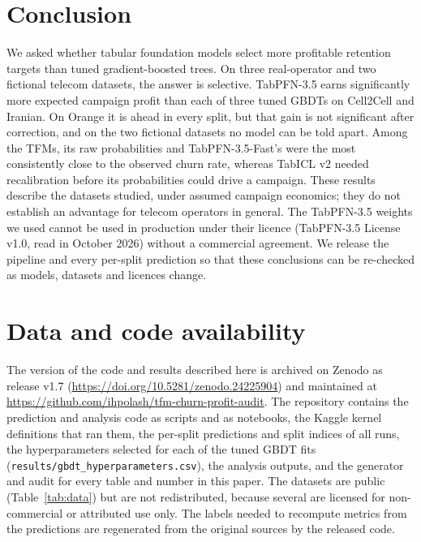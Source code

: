 \documentclass[11pt]{article}
\newcommand{\tfms}{TFMs\xspace}
\begin{document}
\section{Conclusion}

We asked whether tabular foundation models select more profitable retention targets than tuned gradient-boosted trees.
On three real-operator and two fictional telecom datasets, the answer is selective. TabPFN-3.5 earns significantly more
expected campaign profit than each of three tuned GBDTs on Cell2Cell and Iranian. On Orange it is ahead in every
split, but that gain is not significant after correction, and on the two fictional datasets no model can be told
apart. Among the \tfms, its raw probabilities and TabPFN-3.5-Fast's were the most consistently close to the observed churn
rate, whereas TabICL v2 needed recalibration before its probabilities could drive a campaign. These results describe the datasets
studied, under assumed campaign economics; they do not establish an advantage for telecom operators in general. The
TabPFN-3.5 weights we used cannot be used in production under their licence (TabPFN-3.5 License v1.0, read in October
2026) without a commercial agreement. We release the pipeline and every per-split prediction so that these conclusions
can be re-checked as models, datasets and licences change.

\section*{Data and code availability}\label{sec:availability}
\begin{sloppypar}
The version of the code and results described here is archived on Zenodo as release v1.7
(\url{https://doi.org/10.5281/zenodo.24225904}) and maintained at
\url{https://github.com/ihpolash/tfm-churn-profit-audit}. The repository contains the prediction and analysis code as
scripts and as notebooks, the Kaggle kernel definitions that ran them, the per-split predictions and split indices of
all \nRuns{} runs, the hyperparameters selected for each of the \nHyperConfigs{} tuned GBDT fits
(\texttt{results/gbdt\_hyperparameters.csv}), the analysis outputs, and the generator and audit for every table and number in this paper. The
datasets are public (Table~\ref{tab:data}) but are not redistributed, because several are licensed for non-commercial
or attributed use only. The labels needed to recompute metrics from the predictions are regenerated from the original
sources by the released code.
\end{sloppypar}
\end{document}
